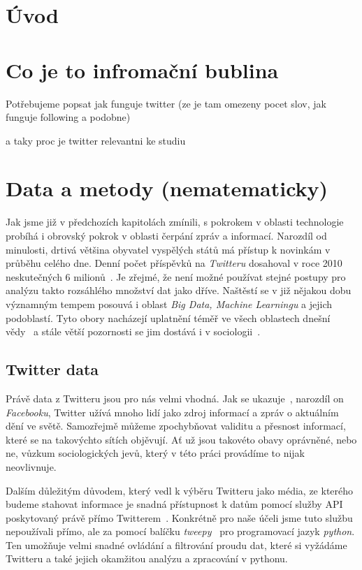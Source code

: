 \documentclass[12pt, a4paper]{article}
\numberwithin{equation}{section} 	%
\begin{document}

\newpage
\section*{Úvod}
\noindent


\newpage
\section{Co je to infromační bublina}
\noindent
Potřebujeme popsat jak funguje twitter (ze je tam omezeny pocet slov, jak funguje following a podobne)~\cite{wikiTwitter}

a taky proc je twitter relevantni ke studiu~\cite{whyNewsOnTwitter}

\newpage
\section{Data a metody (nematematicky)}
\noindent Jak jsme již v předchozích kapitolách zmínili, s pokrokem v oblasti technologie probíhá i obrovský pokrok v oblasti čerpání zpráv a informací. Narozdíl od minulosti, drtivá většina obyvatel vyspělých států má přístup k novinkám v průběhu celého dne. Denní počet příspěvků na \textit{Twitteru} dosahoval v roce 2010 neskutečných 6 milionů~\cite{Mathioudakis2010}. Je zřejmé, že není možné používat stejné postupy pro analýzu takto rozsáhlého množství dat jako dříve. Naštěstí se v již nějakou dobu významným tempem posouvá i oblast \textit{Big Data, Machine Learningu} a jejich podoblastí. Tyto obory nacházejí uplatnění téměř ve všech oblastech dnešní vědy~\cite{Huberman2012-2-15} a stále větší pozornosti se jim dostává i v sociologii~\cite{Tinati2014, McFarland2016, Shah2015-04-09}.

\subsection{Twitter data}
\noindent Právě data z Twitteru jsou pro nás velmi vhodná. Jak se ukazuje~\cite{whyNotFb}, narozdíl on \textit{Facebooku}, Twitter užívá mnoho lidí jako zdroj informací a zpráv o aktuálním dění ve světě. Samozřejmě můžeme zpochybňovat validitu a přesnost informací, které se na takovýchto sítích objěvují. Ať už jsou takovéto obavy oprávněné, nebo ne, vůzkum sociologických jevů, který v této práci provádíme to nijak neovlivnuje.

Dalším důležitým důvodem, který vedl k výběru Twitteru jako média, ze kterého budeme stahovat informace je snadná přístupnost k datům pomocí služby API poskytovaný právě přímo Twitterem~\cite{twitterAPI}. Konkrétně pro naše účeli jsme tuto službu nepoužívali přímo, ale za pomocí balíčku \textit{tweepy}~\cite{tweepy} pro programovací jazyk \textit{python}. Ten umožňuje velmi snadné ovládání a filtrování proudu dat, které si vyžádáme Twitteru a také jejich okamžitou analýzu a zpracování v pythonu.
\end{document}
